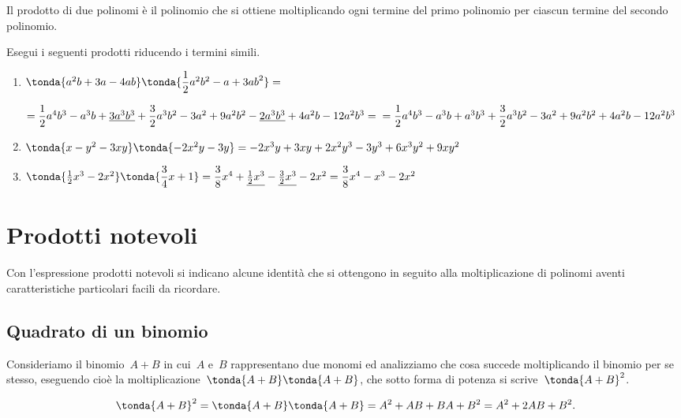 Il prodotto di due polinomi è il polinomio che si ottiene
moltiplicando ogni termine del primo polinomio per ciascun termine del
secondo polinomio.

 \begin{esempio}
 Esegui i seguenti prodotti riducendo i termini simili.

 \begin{enumerate}
\item 
\(\tonda{a^{2}b+3a-4{ab}}\tonda{\dfrac{1}{2}a^{2}b^{2}-a+3{ab}^{2}}=\)

\(=\dfrac{1}{2}a^{4}b^{3}-a^{3}b+\underline{3a^{3}b^{3}}+\dfrac{3}{2}a^{3}b^{2}
-3a^{2}+9a^{2}b^{2} -\underline{2a^{3}b^{3}}+4a^{2}b-12a^{2}b^{3}=\newline
=\dfrac{1}{2}a^{4}b^{3}-a^{3}b+a^{3}b^{3}+\dfrac{3}{2}a^{3}b^{2}-3a^{2}+9a^{2}
b^{2}+4a^{2}b-12a^{2}b^{3}\)
\item 
\(\tonda{x-y^{2}-3{xy}}\tonda{-2x^{2}y-3y}=-2x^{3}y+3{xy}+2x^{2}y^
{3}-3y^{3}+6x^{3}y^{2}+9{xy}^{2}\)
\item 
\(\tonda{\frac{1}{2}x^{3}-2x^{2}}\tonda{\dfrac{3}{4}x+1}=
\dfrac{3}{8}x^{4}+\underline{\frac{1}{2}x^{3}}-
 \underline{\frac{3}{2}x^{3}}-2x^{2}
=\dfrac{3}{8}x^{4}-x^{3}-2x^{2}\)
 \end{enumerate}
 \end{esempio}

\section{Prodotti notevoli}

Con l'espressione prodotti notevoli si indicano alcune
identità che si ottengono in seguito alla moltiplicazione di polinomi
aventi caratteristiche particolari facili da ricordare.

\subsection{Quadrato di un binomio}
\label{subsec:11_prodnot_quadratobinomio}

Consideriamo il binomio~\(A+B\) in cui~\(A\) e~\(B\) rappresentano due monomi ed
analizziamo che cosa succede moltiplicando il binomio per se
stesso, eseguendo cioè la
moltiplicazione~\(\tonda{A+B}\tonda{A+B}\), che sotto forma di 
potenza si scrive~\(\tonda{A+B}^{2}\).

\[\tonda{A+B}^{2}=\tonda{A+B}\tonda{A+B}=A^{2}+{AB}+{BA}+B^{2
}=A^{2}+2{AB}+B^{2}.\]

